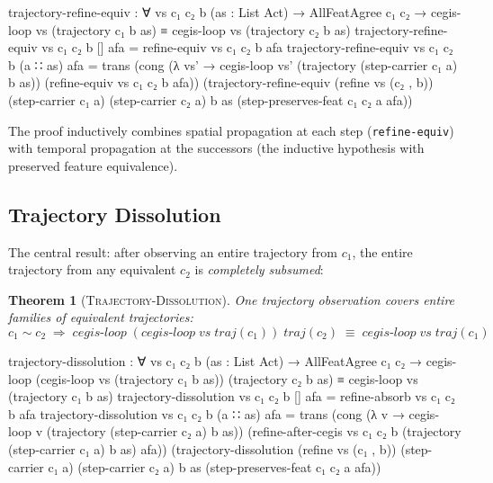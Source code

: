 \documentclass[9pt,a4paper]{article}
\theoremstyle{plain}
\newtheorem{theorem}{Theorem}
\theoremstyle{definition}
\theoremstyle{remark}
\begin{document}
\begin{code}
      trajectory-refine-equiv : ∀ vs c₁ c₂ b (as : List Act) →
        AllFeatAgree c₁ c₂ →
        cegis-loop vs (trajectory c₁ b as)
          ≡ cegis-loop vs (trajectory c₂ b as)
      trajectory-refine-equiv vs c₁ c₂ b [] afa =
        refine-equiv vs c₁ c₂ b afa
      trajectory-refine-equiv vs c₁ c₂ b (a ∷ as) afa =
        trans
          (cong (λ vs' → cegis-loop vs'
                   (trajectory (step-carrier c₁ a) b as))
                (refine-equiv vs c₁ c₂ b afa))
          (trajectory-refine-equiv (refine vs (c₂ , b))
            (step-carrier c₁ a) (step-carrier c₂ a) b as
            (step-preserves-feat c₁ c₂ a afa))
\end{code}

\noindent The proof inductively combines spatial propagation at each step (\texttt{refine-equiv}) with temporal propagation at the successors (the inductive hypothesis with preserved feature equivalence).

\subsection{Trajectory Dissolution}

The central result: after observing an entire trajectory from $c_1$, the entire trajectory from any equivalent $c_2$ is \emph{completely subsumed}:

\begin{theorem}[\textsc{Trajectory-Dissolution}]
One trajectory observation covers entire families of equivalent trajectories:
\[
c_1 \sim c_2 \;\Longrightarrow\; \mathit{cegis\text{-}loop}\;(\mathit{cegis\text{-}loop}\;\mathit{vs}\;\mathit{traj}(c_1))\;\mathit{traj}(c_2) \;\equiv\; \mathit{cegis\text{-}loop}\;\mathit{vs}\;\mathit{traj}(c_1)
\]
\end{theorem}

\begin{code}
      trajectory-dissolution : ∀ vs c₁ c₂ b (as : List Act) →
        AllFeatAgree c₁ c₂ →
        cegis-loop (cegis-loop vs (trajectory c₁ b as))
                   (trajectory c₂ b as)
          ≡ cegis-loop vs (trajectory c₁ b as)
      trajectory-dissolution vs c₁ c₂ b [] afa =
        refine-absorb vs c₁ c₂ b afa
      trajectory-dissolution vs c₁ c₂ b (a ∷ as) afa =
        trans
          (cong (λ v → cegis-loop v
                   (trajectory (step-carrier c₂ a) b as))
                (refine-after-cegis vs c₁ c₂ b
                  (trajectory (step-carrier c₁ a) b as) afa))
          (trajectory-dissolution (refine vs (c₁ , b))
            (step-carrier c₁ a) (step-carrier c₂ a) b as
            (step-preserves-feat c₁ c₂ a afa))
\end{code}
\end{document}
